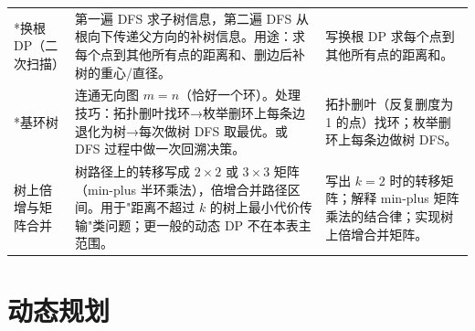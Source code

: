 \documentclass[a4paper,11pt]{article}
\begin{document}
\begin{longtable}{L{2.4cm} L{7.5cm} L{6.8cm}}
*换根 DP（二次扫描）
& 第一遍 DFS 求子树信息，第二遍 DFS 从根向下传递父方向的补树信息。用途：求每个点到其他所有点的距离和、删边后补树的重心/直径。
& 写换根 DP 求每个点到其他所有点的距离和。\\[2mm]

*基环树
& 连通无向图 $m=n$（恰好一个环）。处理技巧：拓扑删叶找环→枚举删环上每条边退化为树→每次做树 DFS 取最优。或 DFS 过程中做一次回溯决策。
& 拓扑删叶（反复删度为 1 的点）找环；枚举删环上每条边做树 DFS。\\[2mm]

树上倍增与矩阵合并
& 树路径上的转移写成 $2\times2$ 或 $3\times3$ 矩阵（min-plus 半环乘法），倍增合并路径区间。用于"距离不超过 $k$ 的树上最小代价传输"类问题；更一般的动态 DP 不在本表主范围。
& 写出 $k=2$ 时的转移矩阵；解释 min-plus 矩阵乘法的结合律；实现树上倍增合并矩阵。\\
\end{longtable}

\newpage
\section{动态规划}
\end{document}

